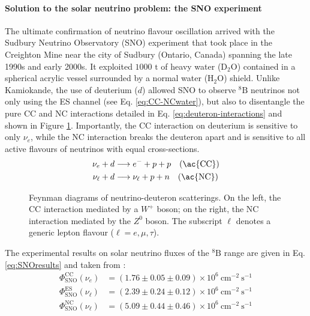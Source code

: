 \paragraph{Solution to the solar neutrino problem: the SNO experiment}
The ultimate confirmation of neutrino flavour oscillation arrived with the Sudbury Neutrino Observatory (SNO) experiment that took place in the Creighton Mine near the city of Sudbury (Ontario, Canada) spanning the late 1990s and early 2000s. It exploited $1000\text{ t}$ of heavy water ($\text{D}_2\text{O}$) contained in a spherical acrylic vessel surrounded by a normal water ($\text{H}_2\text{O}$) shield. Unlike Kamiokande, the use of deuterium ($d$) allowed SNO to observe ${}^8\text{B}$ neutrinos not only using the \ac{ES} channel (see Eq. \ref{eq:CC-NCwater}), but also to disentangle the pure \ac{CC} and \ac{NC} interactions detailed in Eq. \ref{eq:deuteron-interactions} and shown in Figure \ref{fig:feynman-deuteron}. 
Importantly, the \ac{CC} interaction on deuterium is sensitive to only $\nu_e$, while the \ac{NC} interaction breaks the deuteron apart and is sensitive to all active flavours of neutrinos with equal cross-sections. 
\begin{equation}
    \label{eq:deuteron-interactions}
    \begin{aligned}
        \nu_e + d &\longrightarrow e^- + p + p \quad (\text{\ac{CC}})\\
        \nu_\ell + d &\longrightarrow \nu_\ell + p + n \quad (\text{\ac{NC}})
    \end{aligned}
\end{equation}
\begin{figure}[H]
    \centering
    \resizebox{0.7\textwidth}{!}{
        
    }
    \caption{Feynman diagrams of neutrino-deuteron scatterings. On the left, the \ac{CC} interaction mediated by a $W^+$ boson; on the right, the \ac{NC} 
    interaction mediated by the $Z^0$ boson. The subscript $\ell$ denotes a generic lepton flavour ($\ell = e, \mu, \tau$).}
    \label{fig:feynman-deuteron}
\end{figure}
The experimental results on solar neutrino fluxes of the ${}^{8}\text{B}$ range are given in Eq. \ref{eq:SNOresults} and taken from \cite{SNO2002-results}:
\begin{equation}
    \label{eq:SNOresults}
    \begin{aligned}
        \Phi_\text{SNO}^\text{CC}(\nu_e) &= (1.76 \pm 0.05 \pm 0.09) \times 10^{6}~\text{cm}^{-2}~\text{s}^{-1} \\
        \Phi_\text{SNO}^\text{ES}(\nu_\ell) &= (2.39 \pm 0.24 \pm 0.12) \times 10^{6}~\text{cm}^{-2}~\text{s}^{-1} \\
        \Phi_\text{SNO}^\text{NC}(\nu_\ell) &= (5.09 \pm 0.44 \pm 0.46) \times 10^{6}~\text{cm}^{-2}~\text{s}^{-1}
    \end{aligned}
\end{equation} 
